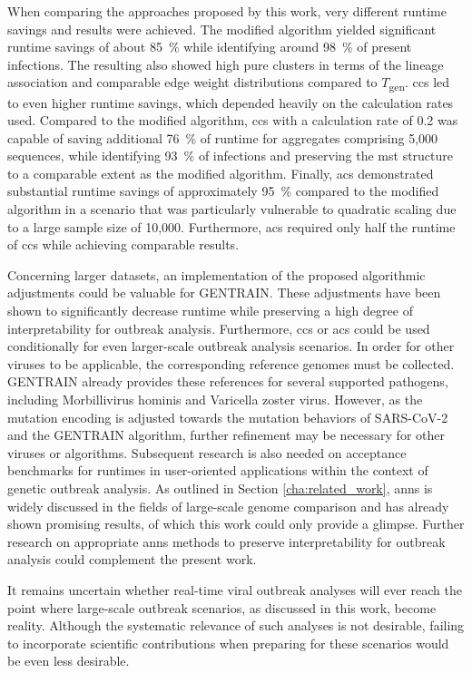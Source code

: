 When comparing the approaches proposed by this work, very different runtime savings and results were achieved. The modified algorithm yielded significant runtime savings of about 85~\% while identifying around 98~\% of present infections. The resulting  also showed high pure clusters in terms of the lineage association and comparable edge weight distributions compared to $T$\textsubscript{gen}. \acrshort{ccs} led to even higher runtime savings, which depended heavily on the calculation rates used. Compared to the modified algorithm, \acrshort{ccs} with a calculation rate of 0.2 was capable of saving additional 76~\% of runtime for aggregates comprising 5,000 sequences, while identifying 93~\% of infections and preserving the \acrshort{mst} structure to a comparable  extent as the modified algorithm. Finally, \acrshort{acs} demonstrated substantial runtime savings of approximately 95~\% compared to the modified algorithm in a scenario that was particularly vulnerable to quadratic scaling due to a large sample size of 10,000. Furthermore, \acrshort{acs} required only half the runtime of \acrshort{ccs} while achieving comparable results.

Concerning larger datasets, an implementation of the proposed algorithmic adjustments could be valuable for GENTRAIN. These adjustments have been shown to significantly decrease runtime while preserving a high degree of interpretability for outbreak analysis. Furthermore, \acrshort{ccs} or \acrshort{acs} could be used conditionally for even larger-scale outbreak analysis scenarios. In order for other viruses to be applicable, the corresponding reference genomes must be collected. GENTRAIN already provides these references for several supported pathogens, including Morbillivirus hominis and Varicella zoster virus.
However, as the mutation encoding is adjusted towards the mutation behaviors of SARS-CoV-2 and the GENTRAIN algorithm, further refinement may be necessary for other viruses or algorithms. Subsequent research is also needed on acceptance benchmarks for runtimes in user-oriented applications within the context of genetic outbreak analysis. 
As outlined in Section \ref{cha:related_work}, \acrshort{anns} is widely discussed in the fields of large-scale genome comparison and has already shown promising results, of which this work could only provide a glimpse. Further research on appropriate \acrshort{anns} methods to preserve interpretability for outbreak analysis could complement the present work.

It remains uncertain whether real-time viral outbreak analyses will ever reach the point where large-scale outbreak scenarios, as discussed in this work, become reality. Although the systematic relevance of such analyses is not desirable, failing to incorporate scientific contributions when preparing for these scenarios would be even less desirable.
